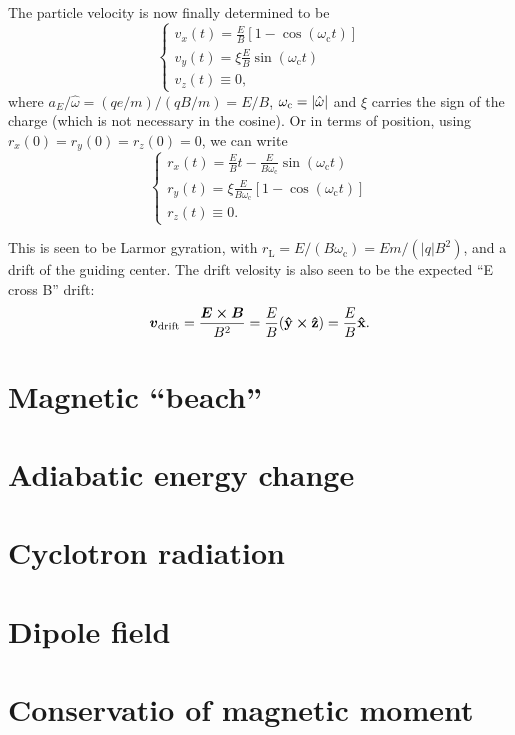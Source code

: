 \documentclass[11pt,a4paper, 
english, swedish %
]{article}
\newcommand{\wc}{\ensuremath{\omega_{\text{c}}}}
\newcommand{\rL}{\ensuremath{r_{\text{L}}}}
\begin{document}
The particle velocity is now finally determined to be
\begin{equation}
\begin{cases}
v_x(t) = \frac{E}{B}[1-\cos(\wc t)]\\
v_y(t) = \xi\frac{E}{B}\sin(\wc t)\\
v_z(t) \equiv 0,
\end{cases}
\end{equation}
where $a_E/\hat\omega = (qe/m)/(qB/m)=E/B$, $\wc=\abs{\hat\omega}$ and
$\xi$ carries the sign of the charge (which is not necessary in the
cosine). Or in terms of position, using $r_x(0)=r_y(0)=r_z(0)=0$, we
can write
\begin{equation}
\begin{cases}
r_x(t) = \frac{E}{B}t-\frac{E}{B\wc}\sin(\wc t)\\
r_y(t) = \xi\frac{E}{B\wc}[1-\cos(\wc t)]\\
r_z(t) \equiv 0.
\end{cases}
\end{equation}

This is seen to be Larmor gyration, with $\rL=E/(B\wc)=Em/(|q|B^2)$,
and a drift of the guiding center. The drift velosity is also seen to
be the expected\footnotemark{} ``E cross B'' drift:
\begin{equation}
\vb*v_\text{drift} = \frac{\vb*E\cross\vb*B}{B^2}
=\frac{E}{B} (\vu{y}\cross\vu{z})
=\frac{E}{B} \vu{x}.
\end{equation}


\section{Magnetic ``beach''}


\section{Adiabatic energy change}


\section{Cyclotron radiation}


\section{Dipole field}



\section{Conservatio of magnetic moment}




\end{document}

